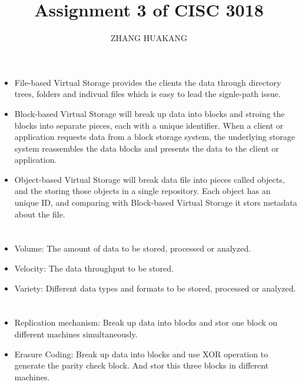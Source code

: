 \documentclass{article}
\title{Assignment 3 of CISC 3018}
\author{ZHANG HUAKANG}
\begin{document}
    \maketitle
    \section{}
        \paragraph{}
        \begin{itemize}
            \item File-based Virtual Storage provides the clients the data through directory trees, folders and indivual files which is easy to lead the signle-path issue.
            \item Block-based Virtual Storage will break up data into blocks and stroing the blocks into separate pieces, each with a unique identifier. When a client or application requests data from a block storage system, the underlying storage system reassembles the data blocks and presents the data to the client or application.
            \item Object-based Virtual Storage will break data file into pieces called objects, and the storing those objects in a single repository. Each object has an unique ID, and comparing with Block-based Virtual Storage it stors metadata about the file.
        \end{itemize}
    \section{}
        \paragraph{}
        \begin{itemize}
            \item Volume: The amount of data to be stored, processed or analyzed.
            \item Velocity: The data throughput to be stored.
            \item Variety: Different data types and formats to be stored, processed or analyzed.
        \end{itemize}
    \section{}
        \subsection{}
            \begin{itemize}
                \item Replication mechanism:  Break up data into blocks and stor one block on different machines simultaneously.
                \item Erasure Coding: Break up data into blocks and use XOR operation to generate the parity check block. And stor this three blocks in different machines.
            \end{itemize}
\end{document}
